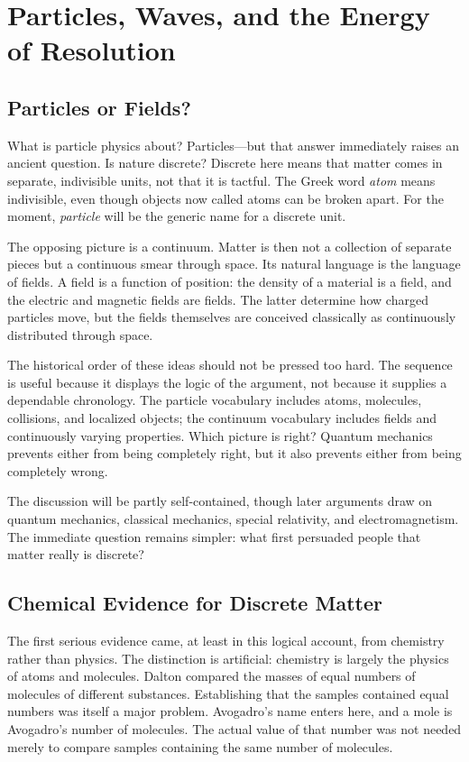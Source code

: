 \chapter{Particles, Waves, and the Energy of Resolution}

\section{Particles or Fields?}

What is particle physics about? Particles---but that answer immediately raises an ancient question. Is nature discrete? Discrete here means that matter comes in separate, indivisible units, not that it is tactful. The Greek word \emph{atom} means indivisible, even though objects now called atoms can be broken apart. For the moment, \emph{particle} will be the generic name for a discrete unit.

The opposing picture is a continuum. Matter is then not a collection of separate pieces but a continuous smear through space. Its natural language is the language of fields. A field is a function of position: the density of a material is a field, and the electric and magnetic fields are fields. The latter determine how charged particles move, but the fields themselves are conceived classically as continuously distributed through space.

The historical order of these ideas should not be pressed too hard. The sequence is useful because it displays the logic of the argument, not because it supplies a dependable chronology. The particle vocabulary includes atoms, molecules, collisions, and localized objects; the continuum vocabulary includes fields and continuously varying properties. Which picture is right? Quantum mechanics prevents either from being completely right, but it also prevents either from being completely wrong.

The discussion will be partly self-contained, though later arguments draw on quantum mechanics, classical mechanics, special relativity, and electromagnetism. The immediate question remains simpler: what first persuaded people that matter really is discrete?

\section{Chemical Evidence for Discrete Matter}

The first serious evidence came, at least in this logical account, from chemistry rather than physics. The distinction is artificial: chemistry is largely the physics of atoms and molecules. Dalton compared the masses of equal numbers of molecules of different substances. Establishing that the samples contained equal numbers was itself a major problem. Avogadro's name enters here, and a mole is Avogadro's number of molecules. The actual value of that number was not needed merely to compare samples containing the same number of molecules.

